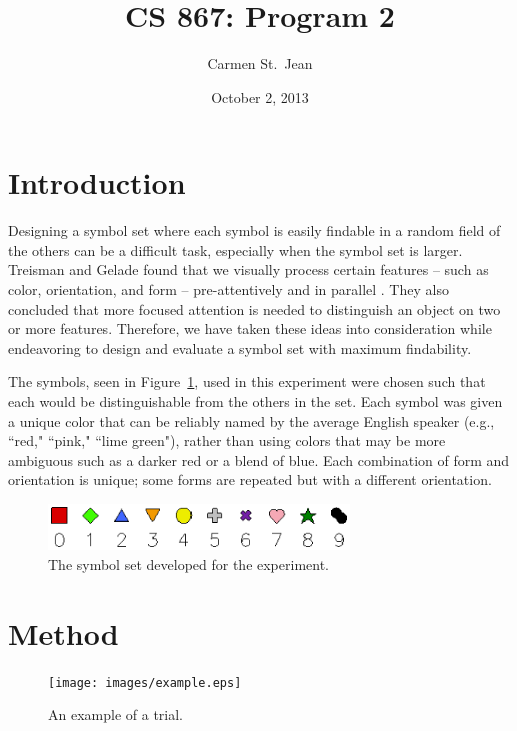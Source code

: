 \documentclass{article} %
\begin{document}
\title{CS 867: Program 2}
\date{October 2, 2013}
\author{Carmen St.\ Jean}

\maketitle

\section{Introduction}
Designing a symbol set where each symbol is easily findable in a random field of the others can be a difficult task, especially when the symbol set is larger.  Treisman and Gelade found that we visually process certain features -- such as color, orientation, and form -- pre-attentively and in parallel \cite{treisman80}.  They also concluded that more focused attention is needed to distinguish an object on two or more features.  Therefore, we have taken these ideas into consideration while endeavoring to design and evaluate a symbol set with maximum findability.

The symbols, seen in Figure~\ref{fig:symbolSet}, used in this experiment were chosen such that each would be distinguishable from the others in the set.  Each symbol was given a unique color that can be reliably named by the average English speaker (e.g., ``red," ``pink," ``lime green"), rather than using colors that may be more ambiguous such as a darker red or a blend of blue.  Each combination of form and orientation is unique; some forms are repeated but with a different orientation.

\begin{figure}[htb]
\centering
	\includegraphics[width=8cm]{images/symbolset.eps}
	\caption{The symbol set developed for the experiment.}
	\label{fig:symbolSet}
\end{figure}

\section{Method}

\begin{figure}
\centering
	\texttt{[image: images/example.eps]}
	\caption{An example of a trial.}
	\label{fig:trialExample}
\end{figure}
\end{document}
